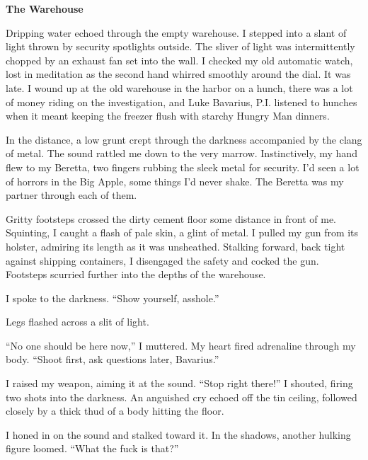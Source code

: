 {\bf The Warehouse}



Dripping water echoed through the empty warehouse. I stepped into a
slant of light thrown by security spotlights outside. The sliver of
light was intermittently chopped by an exhaust fan set into the
wall. I checked my old automatic watch, lost in meditation as the
second hand whirred smoothly around the dial. It was late. I wound
up at the old warehouse in the harbor on a hunch, there was a lot
of money riding on the investigation, and Luke Bavarius, P.I.
listened to hunches when it meant keeping the freezer flush with
starchy Hungry Man dinners.



In the distance, a low grunt crept through the darkness accompanied
by the clang of metal. The sound rattled me down to the very
marrow. Instinctively, my hand flew to my Beretta, two fingers
rubbing the sleek metal for security. I'd seen a lot of horrors in
the Big Apple, some things I'd never shake. The Beretta was my
partner through each of them.



Gritty footsteps crossed the dirty cement floor some distance in
front of me. Squinting, I caught a flash of pale skin, a glint of
metal. I pulled my gun from its holster, admiring its length as it
was unsheathed. Stalking forward, back tight against shipping
containers, I disengaged the safety and cocked the gun. Footsteps
scurried further into the depths of the warehouse.



I spoke to the darkness. ``Show yourself,
asshole.''



Legs flashed across a slit of light.



``No one should be here now,'' I muttered. My heart fired
adrenaline through my body. ``Shoot first, ask questions
later, Bavarius.''



I raised my weapon, aiming it at the sound. ``Stop right
there!'' I shouted, firing two shots into the darkness. An
anguished cry echoed off the tin ceiling, followed closely by a
thick thud of a body hitting the floor.



I honed in on the sound and stalked toward it. In the shadows,
another hulking figure loomed. ``What the fuck is
that?''



